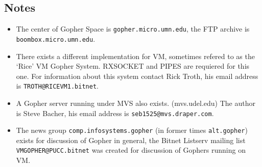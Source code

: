 \subsection{Notes}
 
\begin{itemize}
\item The center of Gopher Space is {\tt gopher.micro.umn.edu}, the
      FTP archive is {\tt boombox.micro.umn.edu}.

\item There exists a different implementation for VM, sometimes refered to
      as the `Rice' VM Gopher System.  RXSOCKET and PIPES are requiered
      for this one.  For information about this system contact Rick Troth,
      his email address is {\tt TROTH@RICEVM1.bitnet}.
 
 
\item A Gopher server running under MVS also exists.  (mvs.udel.edu)
      The author is Steve Bacher, his email address is
      {\tt seb1525@mvs.draper.com}.
 
\item The news group {\tt comp.infosystems.gopher}
      (in former times {\tt alt.gopher})
      exists for discussion of Gopher in general,
      the Bitnet Listserv mailing list {\tt VMGOPHER@PUCC.bitnet}
      was created for discussion of Gophers running on VM.


\end{itemize}
